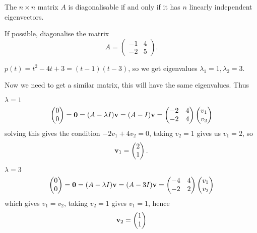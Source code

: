 \documentclass[10pt, a4paper]{article}
\begin{document}
\begin{proposition}
    The $n \times n$ matrix $A$ is diagonalisable if and only if it has $n$ linearly independent eigenvectors.
\end{proposition}

\begin{example}
    If possible,
    diagonalise the matrix
    \[
    A = \begin{pmatrix}
        -1 & 4 \\ -2 & 5
    \end{pmatrix}.
    \]
    \begin{solution}
        $p(t) = t ^ 2 - 4t + 3 = (t - 1)(t - 3)$,
        so we get eigenvalues $\lambda_1 = 1, \lambda_2 = 3$.

        Now we need to get a similar matrix,
        this will have the same eigenvalues.
        Thus

        $\lambda = 1$
        \[
        \begin{pmatrix}
            0 \\ 0
        \end{pmatrix}
        = \mathbf{0} = (A - \lambda I)\mathbf{v} = (A - I)\mathbf{v} = \begin{pmatrix}
            -2 & 4 \\ -2 & 4
        \end{pmatrix}\begin{pmatrix}
            v_1 \\ v_2
        \end{pmatrix}
        \]
        solving this gives the condition $-2v_1 + 4v_2 = 0$,
        taking $v_2 = 1$ gives us $v_1 = 2$,
        so
        \[
        \mathbf{v}_1 = \begin{pmatrix}
            2 \\ 1
        \end{pmatrix}.
        \]
        
        $\lambda = 3$
        \[
        \begin{pmatrix}
            0 \\ 0
        \end{pmatrix}
        = \mathbf{0} = (A - \lambda I)\mathbf{v} = (A - 3I)\mathbf{v} = \begin{pmatrix}
            -4 & 4 \\ -2 & 2
        \end{pmatrix}\begin{pmatrix}
            v_1 \\ v_2
        \end{pmatrix}
        \]
        which gives $v_1 = v_2$,
        taking $v_2 = 1$ gives $v_1 = 1$,
        hence
        \[
        \mathbf{v}_2 = \begin{pmatrix}
            1 \\ 1
        \end{pmatrix}
        \]


\end{solution}
\end{example}
\end{document}
